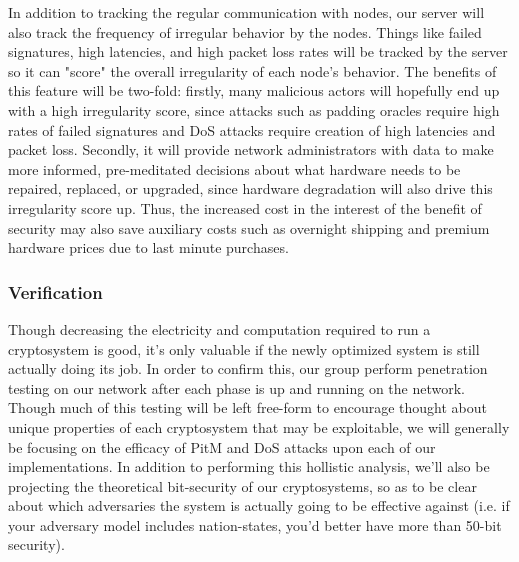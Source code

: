 \documentclass[tikz,a4paper,titlepage]{article}
\begin{document}
\begin{itemize}
    In addition to tracking the regular communication with nodes, our server will also track the frequency of irregular behavior by the nodes. Things like failed signatures, high latencies, and high packet loss rates will be tracked by the server so it can "score" the overall irregularity of each node's behavior. The benefits of this feature will be two-fold: firstly, many malicious actors will hopefully end up with a high irregularity score, since attacks such as padding oracles require high rates of failed signatures and DoS attacks require creation of high latencies and packet loss. Secondly, it will provide network administrators with data to make more informed, pre-meditated decisions about what hardware needs to be repaired, replaced, or upgraded, since hardware degradation will also drive this irregularity score up. Thus, the increased cost in the interest of the benefit of security may also save auxiliary costs such as overnight shipping and premium hardware prices due to last minute purchases.
\end{itemize}

\subsubsection{Verification}
\label{net_sec_veri}

Though decreasing the electricity and computation required to run a cryptosystem is good, it's only valuable if the newly optimized system is still actually doing its job. In order to confirm this, our group perform penetration testing on our network after each phase is up and running on the network. Though much of this testing will be left free-form to encourage thought about unique properties of each cryptosystem that may be exploitable, we will generally be focusing on the efficacy of PitM and DoS attacks upon each of our implementations. In addition to performing this hollistic analysis, we'll also be projecting the theoretical bit-security of our cryptosystems, so as to be clear about which adversaries the system is actually going to be effective against (i.e. if your adversary model includes nation-states, you'd better have more than 50-bit security).


\end{document}

